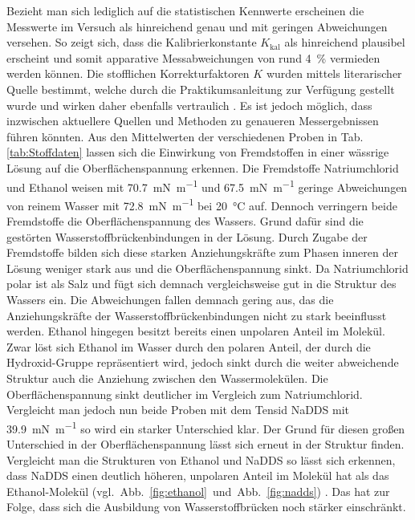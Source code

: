 Bezieht man sich lediglich auf die statistischen Kennwerte erscheinen die Messwerte im Versuch als hinreichend genau und mit geringen Abweichungen versehen. \linebreak
So zeigt sich, dass die Kalibrierkonstante $K_{\text{kal}}$ als hinreichend plausibel erscheint und somit apparative Messabweichungen von rund \SI{4}{\percent} vermieden werden können. Die stofflichen Korrekturfaktoren $K$ wurden mittels literarischer Quelle bestimmt, welche durch die Praktikumsanleitung zur Verfügung gestellt wurde und wirken daher ebenfalls vertraulich \cite{Harkins.1930}. Es ist jedoch möglich, dass inzwischen aktuellere Quellen und Methoden zu genaueren Messergebnissen führen könnten.\linebreak 
Aus den Mittelwerten der verschiedenen Proben in Tab. \ref{tab:Stoffdaten} lassen sich die Einwirkung von Fremdstoffen in einer wässrige Lösung auf die Oberflächenspannung erkennen. Die Fremdstoffe Natriumchlorid und Ethanol weisen mit \SI{70,7}{\milli \newton \per \meter} und \SI{67,5}{\milli \newton \per \meter} geringe Abweichungen von reinem Wasser mit \SI{72,8}{\milli \newton \per \meter} bei \SI{20}{\celsius} auf. Dennoch verringern beide Fremdstoffe die Oberflächenspannung des Wassers. Grund dafür sind die gestörten Wasserstoffbrückenbindungen in der Lösung. Durch Zugabe der Fremdstoffe bilden sich diese starken Anziehungskräfte zum Phasen inneren der Lösung weniger stark aus und die Oberflächenspannung sinkt. Da Natriumchlorid polar ist als Salz und fügt sich demnach vergleichsweise gut in die Struktur des Wassers ein. Die Abweichungen fallen demnach gering aus, das die Anziehungskräfte der Wasserstoffbrückenbindungen nicht zu stark beeinflusst werden. Ethanol hingegen besitzt bereits einen unpolaren Anteil im Molekül. Zwar löst sich Ethanol im Wasser durch den polaren Anteil, der durch die Hydroxid-Gruppe repräsentiert wird, jedoch sinkt durch die weiter abweichende Struktur auch die Anziehung zwischen den Wassermolekülen. Die Oberflächenspannung sinkt deutlicher im Vergleich zum Natriumchlorid. \linebreak Vergleicht man jedoch nun beide Proben mit dem Tensid NaDDS mit \SI{39,9}{\milli \newton \per \meter} so wird ein starker Unterschied klar. Der Grund für diesen großen Unterschied in der Oberflächenspannung lässt sich erneut in der Struktur finden. Vergleicht man die Strukturen von Ethanol und NaDDS so lässt sich erkennen, dass NaDDS einen deutlich höheren, unpolaren Anteil im Molekül hat als das Ethanol-Molekül \mbox{(vgl. Abb. \ref{fig:ethanol} und Abb. \ref{fig:nadds})} . Das hat zur Folge, dass sich die Ausbildung von Wasserstoffbrücken noch stärker einschränkt.

